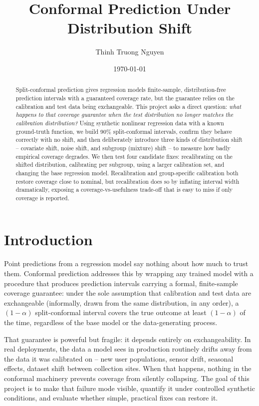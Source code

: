 \documentclass[11pt]{article}
\title{Conformal Prediction Under Distribution Shift}
\author{Thinh Truong Nguyen}
\date{\today}
\begin{document}
\maketitle

\begin{abstract}
Split-conformal prediction gives regression models finite-sample, distribution-free
prediction intervals with a guaranteed coverage rate, but the guarantee relies on the
calibration and test data being exchangeable. This project asks a direct question:
\emph{what happens to that coverage guarantee when the test distribution no longer
matches the calibration distribution?} Using synthetic nonlinear regression data
with a known ground-truth function, we build 90\% split-conformal intervals, confirm
they behave correctly with no shift, and then deliberately introduce three kinds of
distribution shift -- covariate shift, noise shift, and subgroup (mixture) shift --
to measure how badly empirical coverage degrades. We then test four candidate fixes:
recalibrating on the shifted distribution, calibrating per subgroup, using a larger
calibration set, and changing the base regression model. Recalibration and
group-specific calibration both restore coverage close to nominal, but recalibration
does so by inflating interval width dramatically, exposing a coverage-vs-usefulness
trade-off that is easy to miss if only coverage is reported.
\end{abstract}

\section{Introduction}

Point predictions from a regression model say nothing about how much to trust them.
Conformal prediction addresses this by wrapping any trained model with a procedure
that produces prediction intervals carrying a formal, finite-sample coverage
guarantee: under the sole assumption that calibration and test data are exchangeable
(informally, drawn from the same distribution, in any order), a $(1-\alpha)$
split-conformal interval covers the true outcome at least $(1-\alpha)$ of the time,
regardless of the base model or the data-generating process.

That guarantee is powerful but fragile: it depends entirely on exchangeability. In
real deployments, the data a model sees in production routinely drifts away from
the data it was calibrated on -- new user populations, sensor drift, seasonal
effects, dataset shift between collection sites. When that happens, nothing in the
conformal machinery prevents coverage from silently collapsing. The goal of this
project is to make that failure mode visible, quantify it under controlled synthetic
conditions, and evaluate whether simple, practical fixes can restore it.
\end{document}
